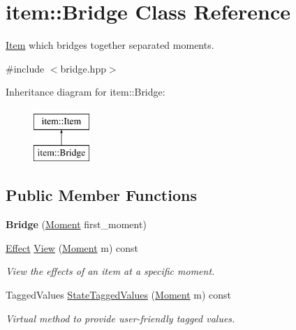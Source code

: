\hypertarget{classitem_1_1_bridge}{}\section{item\+:\+:Bridge Class Reference}
\label{classitem_1_1_bridge}


\hyperlink{classitem_1_1_item}{Item} which bridges together separated moments.  




{\ttfamily \#include $<$bridge.\+hpp$>$}

Inheritance diagram for item\+:\+:Bridge\+:\begin{figure}[H]
\begin{center}
\leavevmode
\includegraphics[height=2.000000cm]{classitem_1_1_bridge}
\end{center}
\end{figure}
\subsection*{Public Member Functions}
\begin{DoxyCompactItemize}
\item 
\mbox{\label{classitem_1_1_bridge_a5bc97b39c3fcb52578942f5f41d7bb7d}} 
{\bfseries Bridge} (\hyperlink{classtimeplane_1_1_moment}{Moment} first\+\_\+moment)
\item 
\hyperlink{classitem_1_1_effect}{Effect} \hyperlink{classitem_1_1_bridge_a644ccbcba577629cd0f07066e64afac1}{View} (\hyperlink{classtimeplane_1_1_moment}{Moment} m) const
\begin{DoxyCompactList}\small\item\em View the effects of an item at a specific moment. \end{DoxyCompactList}\item 
Tagged\+Values \hyperlink{classitem_1_1_bridge_a6339e1cd46f454625ef7cd6dc683f6cd}{State\+Tagged\+Values} (\hyperlink{classtimeplane_1_1_moment}{Moment} m) const
\begin{DoxyCompactList}\small\item\em Virtual method to provide user-\/friendly tagged values. \end{DoxyCompactList}\end{DoxyCompactItemize}
